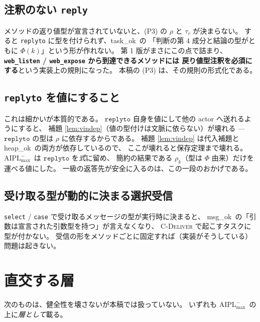 \documentclass[11pt,a4paper]{ltjsarticle}
\theoremstyle{definition}
\theoremstyle{remark}
\newcommand{\Ph}{\Phi}
\newcommand{\heapok}{\textsf{heap\_ok}}
\newcommand{\msgok}{\textsf{msg\_ok}}
\newcommand{\taskok}{\textsf{task\_ok}}
\newcommand{\Amax}{\ensuremath{\mathrm{AIPL}^{-}_{\max}}}
\begin{document}
\subsection{注釈のない \texttt{reply}}

メソッドの返り値型が宣言されていないと、(P3) の $\rho$ と $\tau_r$ が決まらない。
すると \texttt{replyto} に型を付けられず、\taskok\ の
「判断の第 4 成分と結論の型がともに $\Ph(k)$」という形が作れない。
第 1 版がまさにこの点で詰まり、
\textbf{\texttt{web\_listen} / \texttt{web\_expose} から到達できるメソッドには
戻り値型注釈を必須にする}という実装上の規則になった。
本稿の (P3) は、その規則の形式化である。

\subsection{\texttt{replyto} を値にすること}

これは細かいが本質的である。
$\mathtt{replyto}$ 自身を値にして他の actor へ送れるようにすると、
補題 \ref{lem:vindep}（値の型付けは文脈に依らない）が壊れる ---
$\mathtt{replyto}$ の型は $\rho$ に依存するからである。
補題 \ref{lem:vindep} は代入補題と \heapok\ の両方が依存しているので、
ここが壊れると保存定理まで壊れる。
\Amax\ は $\mathtt{replyto}$ を\emph{式}に留め、
簡約の結果である $\rho_k$（型は $\Ph$ 由来）だけを運べる値にした。
一級の返答先が安全に入るのは、この一段のおかげである。

\subsection{受け取る型が動的に決まる選択受信}

\texttt{select} / \texttt{case} で受け取るメッセージの型が実行時に決まると、
\msgok\ の「引数は宣言された引数型を持つ」が言えなくなり、
\textsc{C-Deliver} で起こすタスクに型が付かない。
受信の形をメソッドごとに固定すれば（実装がそうしている）問題は起きない。

\section{直交する層}

次のものは、健全性を壊さないが本稿では扱っていない。
いずれも \Amax\ の上に\emph{層として}載る。
\end{document}
